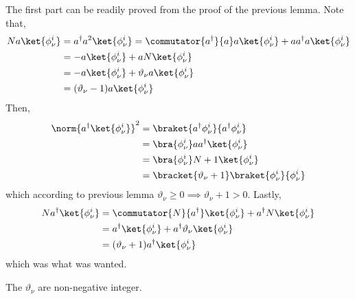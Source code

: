 \begin{prooflemma}
    The first part can be readily proved from the proof of the previous lemma. Note that,
    \begin{align*}
        N a \ket{\phi_{\nu}^i} & = a^{\dagger }a^2 \ket{\phi_{\nu}^i} = \commutator{a^{\dagger}}{a} a \ket{\phi_{\nu}^i} + a a^{\dagger} a \ket{\phi_{\nu}^i} \\
                               & = - a \ket{\phi_{\nu}^i} + a N\ket{\phi_{\nu}^i}                                                                             \\
                               & = - a \ket{\phi_{\nu}^i} + \vartheta_{\nu} a\ket{\phi_{\nu}^i}                                                               \\
                               & =(\vartheta_{\nu} - 1) a \ket{\phi_{\nu}^i}                                                                                  \\
    \end{align*}
    Then,
    \begin{align*}
        \norm{a^{\dagger} \ket{\phi_{\nu}^i}}^2 & = \braket{a^{\dagger} \phi_{\nu}^i}{a^{\dagger} \phi_{\nu}^i}       \\
                                                & = \bra{\phi_{\nu}^i} a a^{\dagger} \ket{\phi_{\nu}^i}               \\
                                                & = \bra{\phi_{\nu}^i} N + 1 \ket{\phi_{\nu}^i}                       \\
                                                & = \bracket{\vartheta_{\nu} + 1} \braket{\phi_{\nu}^i}{\phi_{\nu}^i}
    \end{align*}
    which according to previous lemma \(\vartheta_{\nu} \geq 0 \implies \vartheta_{\nu} + 1 > 0\). Lastly,
    \begin{align*}
        N a^{\dagger} \ket{\phi_{\nu}^i} & = \commutator{N}{a^{\dagger}} \ket{\phi_{\nu}^i} + a^{\dagger} N \ket{\phi_{\nu}^i} \\
                                         & = a^{\dagger} \ket{\phi_{\nu}^i} + a^{\dagger} \vartheta_{\nu} \ket{\phi_{\nu}^i}   \\
                                         & = (\vartheta_{\nu} + 1) a^{\dagger} \ket{\phi_{\nu}^i}
    \end{align*}
    which was what was wanted.
\end{prooflemma}

\begin{lemma}
    The \(\vartheta_{\nu}\) are non-negative integer.
\end{lemma}

